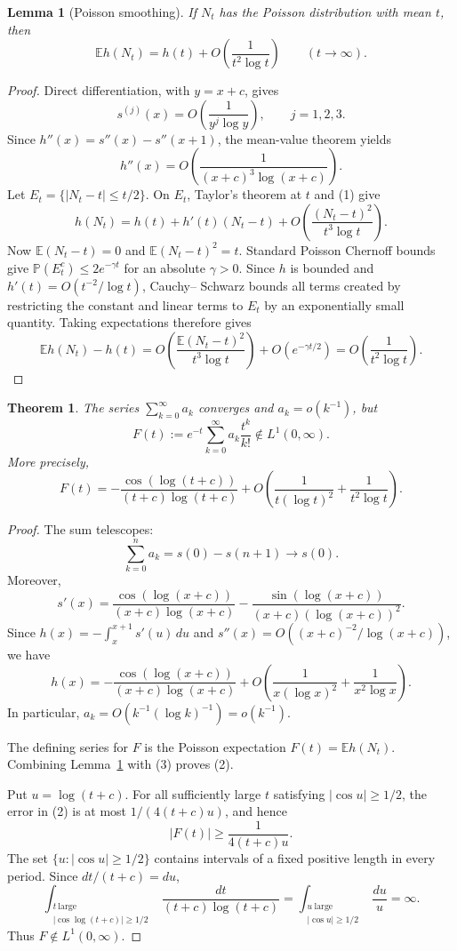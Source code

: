 \documentclass[11pt]{article}
\newtheorem{theorem}{Theorem}
\newtheorem{lemma}{Lemma}
\begin{document}
\begin{lemma}[Poisson smoothing]\label{lem:poisson}
If $N_t$ has the Poisson distribution with mean $t$, then
\[
 \mathbb E h(N_t)=h(t)+O\!\left(\frac1{t^2\log t}\right)
 \qquad(t\to\infty).
\]
\end{lemma}

\begin{proof}
Direct differentiation, with $y=x+c$, gives
\[
 s^{(j)}(x)=O\!\left(\frac1{y^j\log y}\right),
 \qquad j=1,2,3.
\]
Since $h''(x)=s''(x)-s''(x+1)$, the mean-value theorem yields
\[
 h''(x)=O\!\left(\frac1{(x+c)^3\log(x+c)}\right).\tag{1}
\]
Let $E_t=\{|N_t-t|\le t/2\}$.  On $E_t$, Taylor's theorem at $t$ and
(1) give
\[
 h(N_t)=h(t)+h'(t)(N_t-t)
 +O\!\left(\frac{(N_t-t)^2}{t^3\log t}\right).
\]
Now $\mathbb E(N_t-t)=0$ and $\mathbb E(N_t-t)^2=t$.  Standard Poisson
Chernoff bounds give $\mathbb P(E_t^c)\le 2e^{-\gamma t}$ for an absolute
$\gamma>0$.  Since $h$ is bounded and $h'(t)=O(t^{-2}/\log t)$, Cauchy--
Schwarz bounds all terms created by restricting the constant and linear terms
to $E_t$ by an exponentially small quantity.  Taking expectations therefore
gives
\[
 \mathbb E h(N_t)-h(t)
 =O\!\left(\frac{\mathbb E(N_t-t)^2}{t^3\log t}\right)+O(e^{-\gamma t/2})
 =O\!\left(\frac1{t^2\log t}\right).
\]
\end{proof}

\begin{theorem}\label{thm:main}
The series $\sum_{k=0}^\infty a_k$ converges and $a_k=o(k^{-1})$, but
\[
 F(t):=e^{-t}\sum_{k=0}^\infty a_k\frac{t^k}{k!}
 \notin L^1(0,\infty).
\]
More precisely,
\[
 F(t)=-\frac{\cos(\log(t+c))}{(t+c)\log(t+c)}
 +O\!\left(\frac1{t(\log t)^2}+\frac1{t^2\log t}\right).\tag{2}
\]
\end{theorem}

\begin{proof}
The sum telescopes:
\[
 \sum_{k=0}^n a_k=s(0)-s(n+1)\longrightarrow s(0).
\]
Moreover,
\[
 s'(x)=\frac{\cos(\log(x+c))}{(x+c)\log(x+c)}
       -\frac{\sin(\log(x+c))}{(x+c)(\log(x+c))^2}.
\]
Since $h(x)=-\int_x^{x+1}s'(u)\,du$ and
$s''(x)=O((x+c)^{-2}/\log(x+c))$, we have
\[
 h(x)=-\frac{\cos(\log(x+c))}{(x+c)\log(x+c)}
 +O\!\left(\frac1{x(\log x)^2}+\frac1{x^2\log x}\right).\tag{3}
\]
In particular, $a_k=O(k^{-1}(\log k)^{-1})=o(k^{-1})$.

The defining series for $F$ is the Poisson expectation
$F(t)=\mathbb E h(N_t)$.  Combining Lemma~\ref{lem:poisson} with (3) proves
(2).

Put $u=\log(t+c)$.  For all sufficiently large $t$ satisfying
$|\cos u|\ge1/2$, the error in (2) is at most
$1/(4(t+c)u)$, and hence
\[
 |F(t)|\ge \frac1{4(t+c)u}.
\]
The set $\{u:|\cos u|\ge1/2\}$ contains intervals of a fixed positive
length in every period.  Since $dt/(t+c)=du$,
\[
 \int_{\substack{t\ \mathrm{large}\\|\cos\log(t+c)|\ge1/2}}
 \frac{dt}{(t+c)\log(t+c)}
 =\int_{\substack{u\ \mathrm{large}\\|\cos u|\ge1/2}}\frac{du}{u}
 =\infty.
\]
Thus $F\notin L^1(0,\infty)$.
\end{proof}
\end{document}
